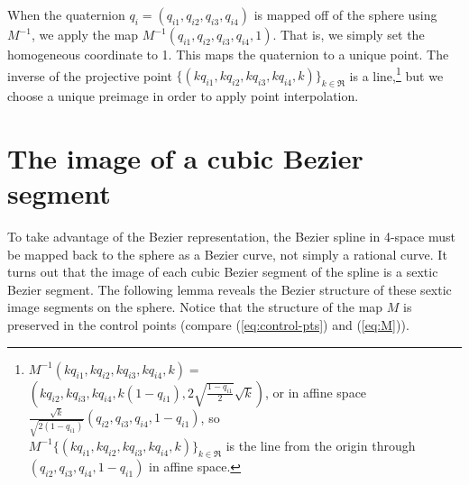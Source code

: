 When the quaternion $q_i = (q_{i1},q_{i2},q_{i3},q_{i4})$ is mapped off
of the sphere using $M^{-1}$,
we apply the map $M^{-1}(q_{i1},q_{i2},q_{i3},q_{i4},1)$.
That is, we simply set the homogeneous coordinate to 1.
This maps the quaternion to a unique point.
The inverse of the projective point 
$\{(kq_{i1},kq_{i2},kq_{i3},kq_{i4},k)\}_{k \in \Re}$
is a line,\footnote{$M^{-1}(kq_{i1},kq_{i2},kq_{i3},kq_{i4},k) =$ \\
	$(kq_{i2},kq_{i3},kq_{i4},
	k(1-q_{i1}),2\sqrt{\frac{1-q_{i1}}{2}} \sqrt{k})$, 
	or in affine space 
	$\frac{\sqrt{k}}{\sqrt{2(1-q_{i1})}} (q_{i2},q_{i3},q_{i4},1-q_{i1})$,
	so \\
	$M^{-1}\{(kq_{i1},kq_{i2},kq_{i3},kq_{i4},k)\}_{k \in \Re}$
	is the line from the origin through $(q_{i2},q_{i3},q_{i4},1-q_{i1})$ 
	in affine space.}
but we choose a unique preimage in order to apply point interpolation.


\section{The image of a cubic Bezier segment}
\label{sec:sextic}

To take advantage of the Bezier representation,
the Bezier spline in 4-space must be mapped back to the sphere
as a Bezier curve, not simply a rational curve.
It turns out that the image of each cubic Bezier segment of the spline
is a sextic Bezier segment.
The following lemma reveals the Bezier structure of these sextic
image segments on the sphere.
Notice that the structure of the map $M$ is preserved in the control
points (compare (\ref{eq:control-pts}) and (\ref{eq:M})).

